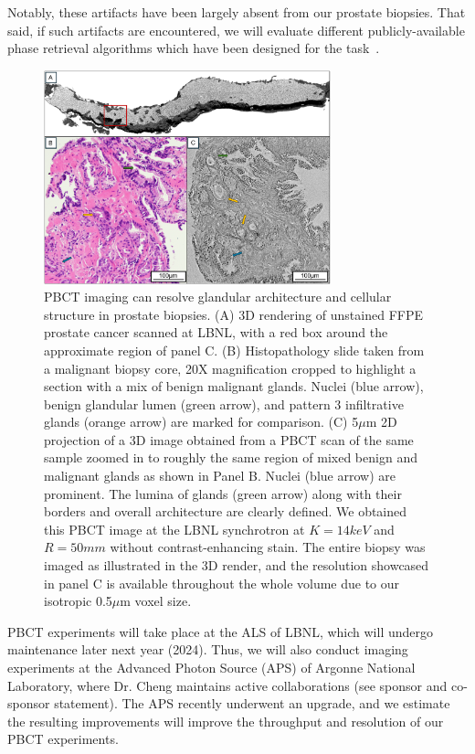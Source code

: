 \documentclass{NIHGrant}
\theoremstyle{theorem}
\begin{document}
Notably, these
artifacts have been largely absent from our prostate biopsies. That said, if
such artifacts are encountered, we will evaluate different publicly-available
phase retrieval algorithms which have been designed for the
task~\cite{mohan_non-linear_2023}.

\begin{figure}
  \vspace{-0.5cm} \includegraphics[width=0.74\textwidth]{ ./figures/fig1_resub.png }
  \caption{ PBCT imaging can resolve glandular architecture and cellular structure in prostate biopsies.
    (A) 3D rendering of unstained FFPE prostate cancer scanned at LBNL, with a red box around the approximate region of panel C. (B) Histopathology slide taken from a malignant biopsy core, 20X
    magnification cropped to highlight a section with a mix of benign malignant glands. Nuclei
    (blue arrow), benign glandular lumen (green arrow), and pattern 3 infiltrative glands (orange arrow) are marked for comparison. (C) 5$\mu$m
    2D projection of a 3D image obtained from a PBCT scan of the same sample
    zoomed in to roughly the same region of mixed benign and malignant glands as shown in Panel
    B. Nuclei (blue arrow) are prominent. The lumina of glands (green arrow)
    along with their borders and overall architecture are clearly defined. We obtained this PBCT image at
    the LBNL synchrotron at \(K=14keV\) and
    \(R=50mm\) without contrast-enhancing stain. The entire biopsy was
    imaged as illustrated in the 3D render, and the resolution showcased in panel C is available throughout the whole volume due to our isotropic 0.5$\mu$m voxel size.}\label{fig:match_histo}
\end{figure}

PBCT experiments will take place at the ALS of LBNL, which will undergo maintenance later next year (2024). Thus, we will also conduct imaging experiments at the Advanced Photon Source (APS) of Argonne National Laboratory, where Dr. Cheng maintains active collaborations (see sponsor and co-sponsor statement). The APS recently underwent an upgrade, and we estimate the resulting improvements will improve the throughput and resolution of our PBCT experiments.
\end{document}
